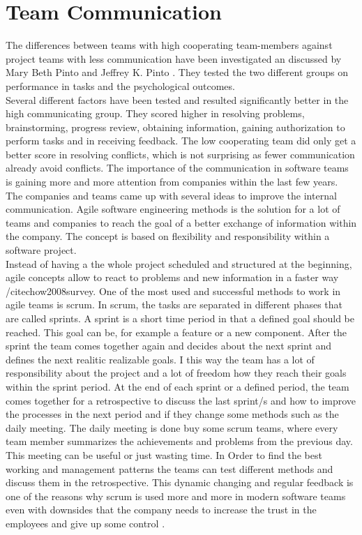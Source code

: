 \section{Team Communication}
The differences between teams with high cooperating team-members against project teams with less communication have been investigated an discussed by Mary Beth Pinto and Jeffrey K. Pinto \cite{pinto1990project}. They tested the two different groups on performance in tasks and the psychological outcomes.\\ 
Several different factors have been tested and resulted significantly better in the high communicating group. They scored higher in resolving problems, brainstorming, progress review, obtaining information, gaining authorization to perform tasks and in receiving feedback. The low cooperating team did only get a better score in resolving conflicts, which is not surprising as fewer communication already avoid conflicts. 
\bigbreak
The importance of the communication in software teams is gaining more and more attention from companies within the last few years. The companies and teams came up with several ideas to improve the internal communication. 
Agile software engineering methods is the solution for a lot of teams and companies to reach the goal of a better exchange of information within the company. The concept is based on flexibility and responsibility within a software project.\\
Instead of having a the whole project scheduled and structured at the beginning, agile concepts allow to react to problems and new information in a faster way /cite{chow2008survey}. One of the most used and successful methods to work in agile teams is scrum.
\bigbreak
In scrum, the tasks are separated in different phases that are called sprints. A sprint is a short time period in that a defined goal should be reached. This goal can be, for example a feature or a new component. After the sprint the team comes together again and decides about the next sprint and defines the next realitic realizable goals. I this way the team has a lot of responsibility about the project and a lot of freedom how they reach their goals within the sprint period. At the end of each sprint or a defined period, the team comes together for a retrospective to discuss the last sprint/s and how to improve the processes in the next period and if they change some methods such as the daily meeting. The daily meeting is done buy some scrum teams, where every team member summarizes the achievements and problems from the previous day. This meeting can be useful or just wasting time. In Order to find the best working and management patterns the teams can test different methods and discuss them in the retrospective. This dynamic changing and regular feedback is one of the reasons why scrum is used more and more in modern software teams \cite{rising2000scrum} \cite{moe2010teamwork} even with downsides that the company needs to increase the trust in the employees and give up some control \cite{ramesh2006can}.
